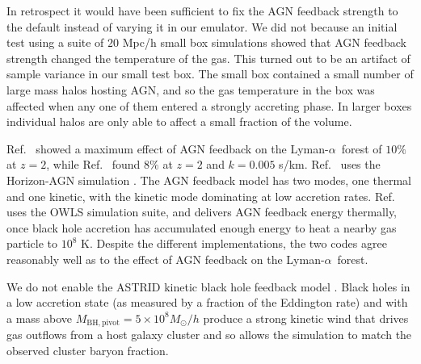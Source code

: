 \documentclass[a4paper,11pt]{article}
\newcommand{\Lya}{Lyman-$\alpha$}
\begin{document}
In retrospect it would have been sufficient to fix the AGN feedback strength to the default instead of varying it in our emulator. We did not because an initial test using a suite of $20$ Mpc/h small box simulations showed that AGN feedback strength changed the temperature of the gas. This turned out to be an artifact of sample variance in our small test box. The small box contained a small number of large mass halos hosting AGN, and so the gas temperature in the box was affected when any one of them entered a strongly accreting phase. In larger boxes individual halos are only able to affect a small fraction of the volume.


Ref.~\cite{Viel:2013} showed a maximum effect of AGN feedback on the \Lya~forest of $10\%$ at $z=2$, while Ref.~\cite{Chabanier:2020} found $8\%$ at $z=2$ and $k = 0.005$ s/km. Ref.~\cite{Chabanier:2020} uses the Horizon-AGN simulation \cite{Dubois:2016}. The AGN feedback model has two modes, one thermal and one kinetic, with the kinetic mode dominating at low accretion rates. Ref.~\cite{Viel:2013} uses the OWLS simulation suite, and delivers AGN feedback energy thermally, once black hole accretion has accumulated enough energy to heat a nearby gas particle to $10^8$ K. Despite the different implementations, the two codes agree reasonably well as to the effect of AGN feedback on the \Lya~forest.


We do not enable the ASTRID kinetic black hole feedback model \cite{Ni:2023}. Black holes in a low accretion state (as measured by a fraction of the Eddington rate) and with a mass above $M_\mathrm{BH, pivot} = 5\times 10^8 M_\odot/h$ produce a strong kinetic wind that drives gas outflows from a host galaxy cluster and so allows the simulation to match the observed cluster baryon fraction.
\end{document}
